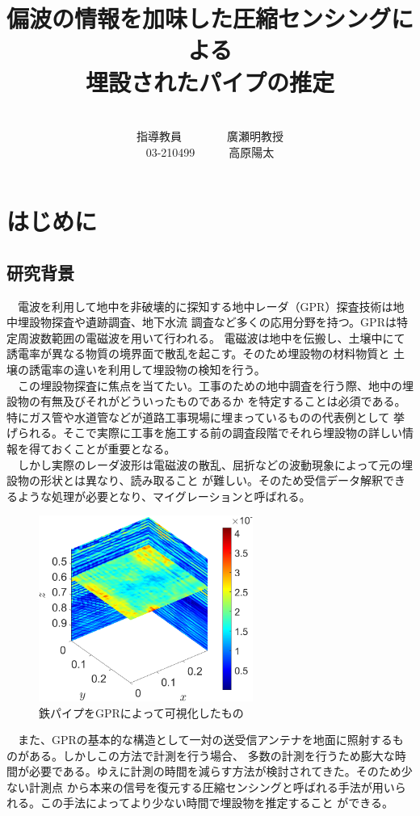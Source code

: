 \documentclass[12pt,a4paper]{jsreport}
\title{偏波の情報を加味した圧縮センシングによる\\埋設されたパイプの推定}
\author{\\指導教員　　　　廣瀬明教授\\
03-210499　　　高原陽太
}
\begin{document}
\maketitle
\tableofcontents
\clearpage
\chapter{はじめに}
\section{研究背景}
　電波を利用して地中を非破壊的に探知する地中レーダ（GPR）探査技術は地中埋設物探査や遺跡調査、地下水流
調査など多くの応用分野を持つ\cite{radar1}\cite{radar2}。GPRは特定周波数範囲の電磁波を用いて行われる。
電磁波は地中を伝搬し、土壌中にて誘電率が異なる物質の境界面で散乱を起こす。そのため埋設物の材料物質と
土壌の誘電率の違いを利用して埋設物の検知を行う。
\\　この埋設物探査に焦点を当てたい。工事のための地中調査を行う際、地中の埋設物の有無及びそれがどういったものであるか
を特定することは必須である。特にガス管や水道管などが道路工事現場に埋まっているものの代表例として
挙げられる。そこで実際に工事を施工する前の調査段階でそれら埋設物の詳しい情報を得ておくことが重要となる。
\\　しかし実際のレーダ波形は電磁波の散乱、屈折などの波動現象によって元の埋設物の形状とは異なり、読み取ること
が難しい。そのため受信データ解釈できるような処理が必要となり、マイグレーションと呼ばれる。


\begin{figure}[h]
  \begin{center}
   \includegraphics[width=7cm]{./image/0918.png}
   
  \caption{鉄パイプをGPRによって可視化したもの}\label{鉄パイプをGPRによって可視化したもの}
  \end{center}
  \end{figure}

　また、GPRの基本的な構造として一対の送受信アンテナを地面に照射するものがある。しかしこの方法で計測を行う場合、
多数の計測を行うため膨大な時間が必要である。ゆえに計測の時間を減らす方法が検討されてきた。そのため少ない計測点
から本来の信号を復元する圧縮センシングと呼ばれる手法が用いられる。この手法によってより少ない時間で埋設物を推定すること
ができる。
\end{document}
